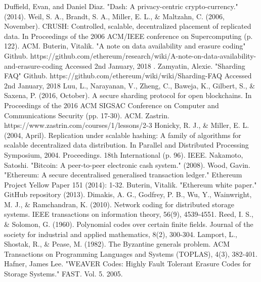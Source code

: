 \documentclass[conference]{IEEEtran}
\begin{document}
\begin{thebibliography}{00}
     Duffield, Evan, and Daniel Diaz. "Dash: A privacy-centric
        crypto-currency." (2014).
     Weil, S. A., Brandt, S. A., Miller, E. L., \& Maltzahn, C.
        (2006, November). CRUSH: Controlled, scalable, decentralized placement
        of replicated data. In Proceedings of the 2006 ACM/IEEE conference on
        Supercomputing (p. 122). ACM.
     Buterin, Vitalik. "A note on data availability and erasure coding"
        Github. https://github.com/ethereum/research/wiki/A-note-on-data-availability-and-erasure-coding
        Accessed 2nd January, 2018 . 
     Zamyatin, Alexie. "Sharding FAQ" Github.
        https://github.com/ethereum/wiki/wiki/Sharding-FAQ
        Accessed 2nd January, 2018
     Luu, L., Narayanan, V., Zheng, C., Baweja, K., Gilbert, S., \&
        Saxena, P. (2016, October). A secure sharding protocol for open
        blockchains. In Proceedings of the 2016 ACM SIGSAC Conference on
        Computer and Communications Security (pp. 17-30). ACM.
     Zastrin. https://www.zastrin.com/courses/1/lessons/2-3
     Honicky, R. J., \& Miller, E. L. (2004, April). Replication
        under scalable hashing: A family of algorithms for scalable
        decentralized data distribution. In Parallel and Distributed Processing
        Symposium, 2004. Proceedings. 18th International (p. 96). IEEE.
     Nakamoto, Satoshi. "Bitcoin: A peer-to-peer electronic cash
        system." (2008).
     Wood, Gavin. "Ethereum: A secure decentralised generalised
        transaction ledger." Ethereum Project Yellow Paper 151 (2014): 1-32.
     Buterin, Vitalik. "Ethereum white paper." GitHub repository
        (2013).
     Dimakis, A. G., Godfrey, P. B., Wu, Y., Wainwright, M. J., &
        Ramchandran, K. (2010). Network coding for distributed storage systems.
        IEEE transactions on information theory, 56(9), 4539-4551.
     Reed, I. S., \& Solomon, G. (1960). Polynomial codes over
        certain finite fields. Journal of the society for industrial and applied
        mathematics, 8(2), 300-304.
     Lamport, L., Shostak, R., & Pease, M. (1982). The Byzantine
        generals problem. ACM Transactions on Programming Languages and Systems
        (TOPLAS), 4(3), 382-401.
     Hafner, James Lee. "WEAVER Codes: Highly Fault
        Tolerant Erasure Codes for Storage Systems." FAST. Vol. 5. 2005.

\end{thebibliography}
\end{document}
